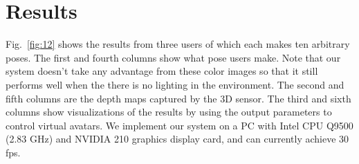 \section{Results}
\label{sec:4}
Fig.~\ref{fig:12} shows the results from three users of which each makes ten arbitrary poses. The first and fourth columns show what pose users make. Note that our system doesn’t take any advantage from these color images so that it still performs well when the there is no lighting in the environment. The second and fifth columns are the depth maps captured by the 3D sensor. The third and sixth columns show visualizations of the results by using the output parameters to control virtual avatars. We implement our system on a PC with Intel CPU Q9500 (2.83 GHz) and NVIDIA 210 graphics display card, and can currently achieve 30 fps.


